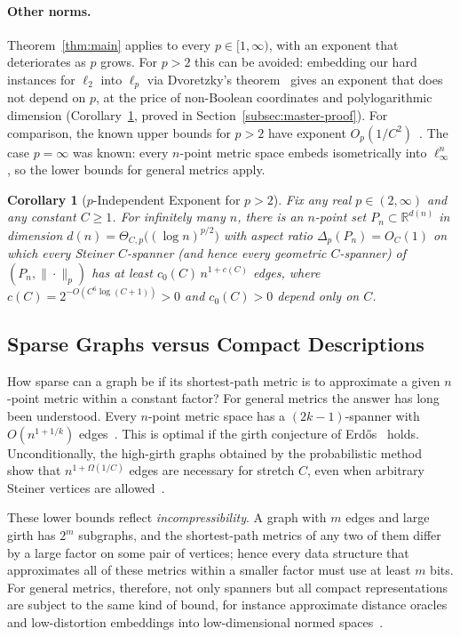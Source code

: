 \documentclass[11pt]{article}
\newtheorem{corollary}[theorem]{Corollary}
\theoremstyle{definition}
\theoremstyle{remark}
\newcommand{\R}{\mathbb{R}}
\begin{document}
\paragraph{Other norms.}
Theorem~\ref{thm:main} applies to every $p \in [1, \infty)$, with an exponent that deteriorates as $p$ grows. For $p > 2$ this can be avoided: embedding our hard instances for $\ell_2$ into $\ell_p$ via Dvoretzky's theorem~\cite{figiel1977dimension} gives an exponent that does not depend on $p$, at the price of non-Boolean coordinates and polylogarithmic dimension (Corollary~\ref{cor:lp-dvoretzky}, proved in Section~\ref{subsec:master-proof}). For comparison, the known upper bounds for $p > 2$ have exponent $O_p(1/C^2)$~\cite{krauthgamer2025lipschitz,krauthgamer2025power}. The case $p = \infty$ was known: every $n$-point metric space embeds isometrically into $\ell_\infty^n$, so the lower bounds for general metrics apply.

\begin{corollary}[$p$-Independent Exponent for $p > 2$]
\label{cor:lp-dvoretzky}
Fix any real $p \in (2, \infty)$ and any constant $C \ge 1$. For infinitely many $n$, there is an $n$-point set $P_n \subset \R^{d(n)}$ in dimension $d(n) = \Theta_{C, p}\bigl((\log n)^{p/2}\bigr)$ with aspect ratio $\Delta_p(P_n) = O_C(1)$ on which every Steiner $C$-spanner (and hence every geometric $C$-spanner) of $(P_n, \|\cdot\|_p)$ has at least $c_0(C)\,n^{1 + c(C)}$ edges, where $c(C) = 2^{-O(C^6 \log(C + 1))} > 0$ and $c_0(C) > 0$ depend only on $C$.
\end{corollary}

\subsection{Sparse Graphs versus Compact Descriptions}
\label{subsec:background}

How sparse can a graph be if its shortest-path metric is to approximate a given $n$-point metric within a constant factor? For general metrics the answer has long been understood. Every $n$-point metric space has a $(2k - 1)$-spanner with $O(n^{1 + 1/k})$ edges~\cite{althofer1993sparse}. This is optimal if the girth conjecture of Erd\H{o}s~\cite{erdos1964extremal} holds. Unconditionally, the high-girth graphs obtained by the probabilistic method~\cite{erdos1959graph} show that $n^{1 + \Omega(1/C)}$ edges are necessary for stretch $C$, even when arbitrary Steiner vertices are allowed~\cite{althofer1993sparse,rabinovich1998lower}.

These lower bounds reflect \emph{incompressibility}. A graph with $m$ edges and large girth has $2^m$ subgraphs, and the shortest-path metrics of any two of them differ by a large factor on some pair of vertices; hence every data structure that approximates all of these metrics within a smaller factor must use at least $m$ bits. For general metrics, therefore, not only spanners but all compact representations are subject to the same kind of bound, for instance approximate distance oracles~\cite{thorup2005approximate} and low-distortion embeddings into low-dimensional normed spaces~\cite{matousek1996distortion}.
\end{document}
